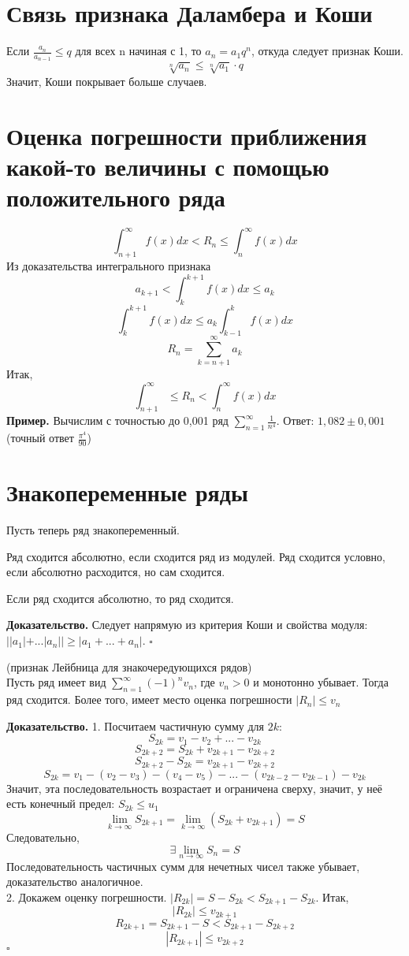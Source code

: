 \section{Связь признака Даламбера и Коши}
Если $\frac{a_n}{a_{n-1}}\leqslant q$ для 
всех n начиная с 1, то $a_n=a_1q^n$, откуда следует признак Коши. 
$$\sqrt[n]{a_n}\leqslant \sqrt[n]{a_1}\cdot q$$
Значит, Коши покрывает больше случаев. 
\section{Оценка погрешности приближения какой-то величины с помощью
положительного ряда}
$$\int^\infty_{n+1} f(x)dx<R_n\leqslant \int^\infty_nf(x)dx$$ 
Из доказательства интегрального признака
$$a_{k+1}<\int^{k+1}_kf(x)dx\leqslant a_k$$ 
$$\int^{k+1}_kf(x)dx\leqslant a_k\int^k_{k-1}f(x)dx$$ 
$$R_n=\sum\limits_{k=n+1}^{\infty} a_k$$ 
Итак, 
$$\int^\infty_{n+1}\leqslant R_n<\int^\infty_nf(x)dx$$
\textbf{Пример.} Вычислим с точностью до 0,001 ряд 
$\sum\limits_{n=1}^{\infty} \frac{1}{n^4}$. Ответ: $1,082\pm0,001$
(точный ответ $\frac{\pi^4}{90}$)
\section{Знакопеременные ряды}
Пусть теперь ряд знакопеременный.
\begin{defin}
Ряд сходится абсолютно, если сходится ряд из модулей. Ряд сходится условно,
если абсолютно расходится, но сам сходится. 
\end{defin}
\begin{theor}
Если ряд сходится абсолютно, то ряд сходится.
\end{theor}
\textbf{Доказательство.}  Следует напрямую из критерия Коши
и свойства модуля: $| |a_1|+...|a_n| |\geqslant|a_1+...+a_n|$.
$\square$ 
\begin{theor}
    (признак Лейбница для знакочередующихся рядов)\\
    Пусть ряд имеет вид $\sum\limits_{n=1}^{\infty} (-1)^nv_n$, 
    где $v_n>0$ и монотонно убывает. Тогда ряд сходится.  
    Более того, имеет место оценка погрешности $|R_n|\leqslant v_n$
\end{theor}
\textbf{Доказательство.}  1. Посчитаем частичную сумму для $2k:$
$$S_{2k}=v_1-v_2+...-v_{2k}$$ 
$$S_{2k+2}=S_{2k}+v_{2k+1}-v_{2k+2}$$ 
$$S_{2k+2}-S_{2k}=v_{2k+1}-v_{2k+2}$$ 
$$S_{2k}=v_1-(v_2-v_3)-(v_4-v_5)-...-(v_{2k-2}-v_{2k-1})-v_{2k}$$ 
Значит, эта последовательность возрастает и ограничена сверху, значит, у неё
есть конечный предел: $S_{2k}\leqslant u_1$
$$\lim\limits_{k \to \infty} S_{2k+1}=\lim\limits_{k \to \infty} (S_{2k}+
v_{2k+1})=S$$ 
Следовательно, 
$$\exists \lim\limits_{n \to \infty} S_n=S$$
Последовательность частичных сумм для нечетных чисел также убывает, 
доказательство аналогичное. \\
2. Докажем оценку погрешности. $|R_{2k}|=S-S_{2k}<S_{2k+1}-S_{2k}$. Итак,
$$|R_{2k}|\leqslant v_{2k+1}$$ 
$$R_{2k+1}=S_{2k+1}-S<S_{2k+1}-S_{2k+2}$$ 
$$|R_{2k+1}|\leqslant v_{2k+2}$$
$\square$ 
